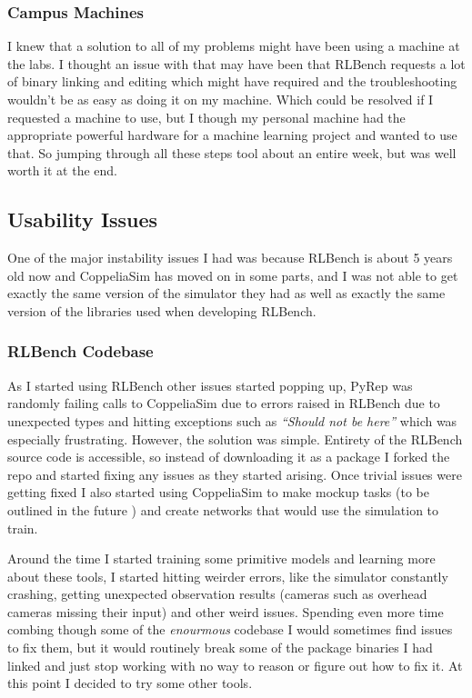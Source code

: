 \subsubsection{Campus Machines}
I knew that a solution to all of my problems might have been using a machine at the labs. I thought an issue with that may have been that RLBench requests a lot of binary linking and editing which might have required and the troubleshooting wouldn't be as easy as doing it on my machine. Which could be resolved if I requested a machine to use, but I though my personal machine had the appropriate powerful hardware for a machine learning project and wanted to use that. So jumping through all these steps tool about an entire week, but was well worth it at the end.


\subsection{Usability Issues}
One of the major instability issues I had was because RLBench is about 5 years old now and CoppeliaSim has moved on in some parts, and I was not able to get exactly the same version of the simulator they had as well as exactly the same version of the libraries used when developing RLBench.

\subsubsection{RLBench Codebase}
As I started using RLBench other issues started popping up, PyRep was randomly failing calls to CoppeliaSim due to errors raised in RLBench due to unexpected types and hitting exceptions such as \emph{``Should not be here''} which was especially frustrating. However, the solution was simple. Entirety of the RLBench source code is accessible, so instead of downloading it as a package I forked the repo and started fixing any issues as they started arising. Once trivial issues were getting fixed I also started using CoppeliaSim to make mockup tasks (to be outlined in the future ) and create networks that would use the simulation to train.

Around the time I started training some primitive models and learning more about these tools, I started hitting weirder errors, like the simulator constantly crashing, getting unexpected observation results (cameras such as overhead cameras  missing their input) and other weird issues. Spending even more time combing though some of the \emph{enourmous} codebase I would sometimes find issues to fix them, but it would routinely break some of the package binaries I had linked and just stop working with no way to reason or figure out how to fix it. At this point I decided to try some other tools.

